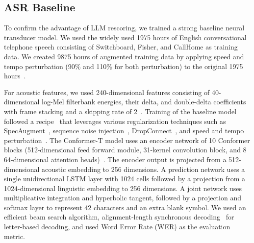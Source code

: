 \documentclass[a4paper]{article}
\begin{document}
\subsection{ASR Baseline}
\label{subsec:asr_baseline}


To confirm the advantage of LLM rescoring, we trained a strong baseline neural transducer model.
We used the widely used 1975 hours of English conversational telephone speech consisting of Switchboard, Fisher, and CallHome as training data\cite{george17:_englis_conver_telep_speec_recog_human_machin}.
We created 9875 hours of augmented training data by applying speed and tempo perturbation (90\% and 110\% for both perturbation) to the original 1975 hours~\cite{ko2015audio}.

For acoustic features, we used 240-dimensional features consisting of 40-dimensional log-Mel filterbank energies, their delta, and double-delta coefficients with frame stacking and a skipping rate of 2~\cite{sak2015fast}.
Training of the baseline model followed a recipe~\cite{saon21:_advan_rnn_trans_techn_speec_recog} that leverages various regularization techniques such as SpecAugment~\cite{park2019specaugment}, sequence noise injection~\cite{saon2019sequence}, DropConnect~\cite{wan2013regularization}, and speed and tempo perturbation~\cite{ko2015audio}. 
The Conformer-T model uses an encoder network of 10 Conformer blocks (512-dimensional feed forward module, 31-kernel convolution block, and 8 64-dimensional attention heads)~\cite{Gulati2020Conformer}. 
The encoder output is projected from a 512-dimensional acoustic embedding to 256 dimensions.
A prediction network uses a single unidirectional LSTM layer with 1024 cells followed by a projection from a 1024-dimensional linguistic embedding to 256 dimensions.
A joint network uses multiplicative integration and hyperbolic tangent, followed by a projection and softmax layer to represent 42 characters and an extra blank symbol. 
We used an efficient beam search algorithm, alignment-length synchronous decoding~\cite{saon20:_align_lengt_synch_decod_for_rnn_trans} for letter-based decoding, and used Word Error Rate (WER) as the evaluation metric.
\end{document}
